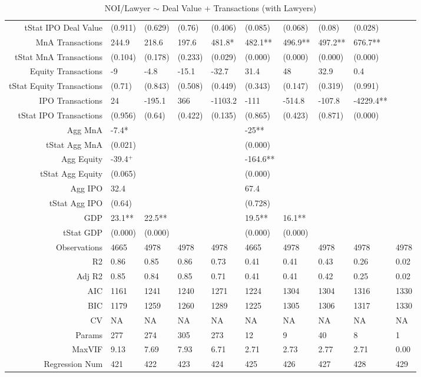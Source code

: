 \begin{table}[ht]
\begin{tabular}{rlllllllll}
  tStat IPO Deal Value & (0.911) & (0.629) & (0.76) & (0.406) & (0.085) & (0.068) & (0.08) & (0.028) &  \\ 
  MnA Transactions & 244.9 & 218.6 & 197.6 & 481.8* & 482.1** & 496.9** & 497.2** & 676.7** &  \\ 
  tStat MnA Transactions & (0.104) & (0.178) & (0.233) & (0.029) & (0.000) & (0.000) & (0.000) & (0.000) &  \\ 
  Equity Transactions & -9 & -4.8 & -15.1 & -32.7 & 31.4 & 48 & 32.9 & 0.4 &  \\ 
  tStat Equity Transactions & (0.71) & (0.843) & (0.508) & (0.449) & (0.343) & (0.147) & (0.319) & (0.991) &  \\ 
  IPO Transactions & 24 & -195.1 & 366 & -1103.2 & -111 & -514.8 & -107.8 & -4229.4** &  \\ 
  tStat IPO Transactions & (0.956) & (0.64) & (0.422) & (0.135) & (0.865) & (0.423) & (0.871) & (0.000) &  \\ 
  Agg MnA & -7.4* &  &  &  & -25** &  &  &  &  \\ 
  tStat Agg MnA & (0.021) &  &  &  & (0.000) &  &  &  &  \\ 
  Agg Equity & -39.4$^{+}$ &  &  &  & -164.6** &  &  &  &  \\ 
  tStat Agg Equity & (0.065) &  &  &  & (0.000) &  &  &  &  \\ 
  Agg IPO & 32.4 &  &  &  & 67.4 &  &  &  &  \\ 
  tStat Agg IPO & (0.64) &  &  &  & (0.728) &  &  &  &  \\ 
  GDP & 23.1** & 22.5** &  &  & 19.5** & 16.1** &  &  &  \\ 
  tStat GDP & (0.000) & (0.000) &  &  & (0.000) & (0.000) &  &  &  \\ 
  Observations & 4665 & 4978 & 4978 & 4978 & 4665 & 4978 & 4978 & 4978 & 4978 \\ 
  R2 & 0.86 & 0.85 & 0.86 & 0.73 & 0.41 & 0.41 & 0.43 & 0.26 & 0.02 \\ 
  Adj R2 & 0.85 & 0.84 & 0.85 & 0.71 & 0.41 & 0.41 & 0.42 & 0.25 & 0.02 \\ 
  AIC & 1161 & 1241 & 1240 & 1271 & 1224 & 1304 & 1304 & 1316 & 1330 \\ 
  BIC & 1179 & 1259 & 1260 & 1289 & 1225 & 1305 & 1306 & 1317 & 1330 \\ 
  CV & NA & NA & NA & NA & NA & NA & NA & NA & NA \\ 
  Params & 277 & 274 & 305 & 273 & 12 & 9 & 40 & 8 & 1 \\ 
  MaxVIF & 9.13 & 7.69 & 7.93 & 6.71 & 2.71 & 2.73 & 2.77 & 2.71 & 0.00 \\ 
  Regression Num & 421 & 422 & 423 & 424 & 425 & 426 & 427 & 428 & 429 \\ 
   \hline
\end{tabular}
\caption{NOI/Lawyer $\sim$ Deal Value + Transactions (with Lawyers)} 
\end{table}
